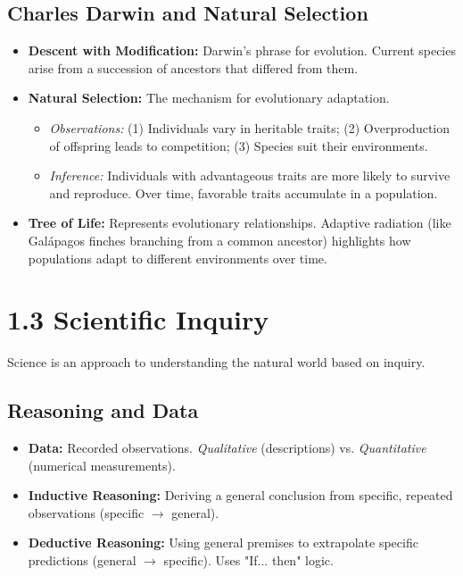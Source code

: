 \documentclass[11pt, a4paper]{article}
\begin{document}
\subsection*{Charles Darwin and Natural Selection}
\begin{itemize}
    \item \textbf{Descent with Modification:} Darwin's phrase for evolution. Current species arise from a succession of ancestors that differed from them.
    \item \textbf{Natural Selection:} The mechanism for evolutionary adaptation.
    \begin{itemize}
        \item \textit{Observations:} (1) Individuals vary in heritable traits; (2) Overproduction of offspring leads to competition; (3) Species suit their environments.
        \item \textit{Inference:} Individuals with advantageous traits are more likely to survive and reproduce. Over time, favorable traits accumulate in a population.
    \end{itemize}
    \item \textbf{Tree of Life:} Represents evolutionary relationships. Adaptive radiation (like Galápagos finches branching from a common ancestor) highlights how populations adapt to different environments over time.
\end{itemize}

\section*{1.3 Scientific Inquiry}
Science is an approach to understanding the natural world based on inquiry.

\subsection*{Reasoning and Data}
\begin{itemize}
    \item \textbf{Data:} Recorded observations. \textit{Qualitative} (descriptions) vs. \textit{Quantitative} (numerical measurements).
    \item \textbf{Inductive Reasoning:} Deriving a general conclusion from specific, repeated observations (specific $\rightarrow$ general).
    \item \textbf{Deductive Reasoning:} Using general premises to extrapolate specific predictions (general $\rightarrow$ specific). Uses "If... then" logic.
\end{itemize}
\end{document}
